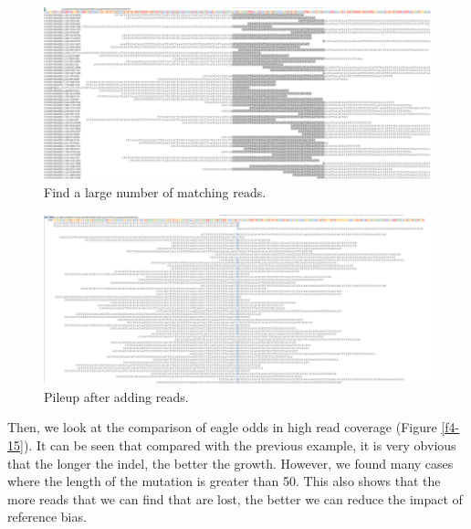 \vspace{1cm}
\begin{figure}[H]
    \centering
    \includegraphics[width=1\columnwidth]{body/image/4-13.png}
    \captionsetup{labelfont=bf}
    \renewcommand{\baselinestretch}{1.0}
    \vspace{-1cm}
    \caption[Find large amount reads in high coverage]{Find a large number of matching reads.}
    \label{f4-13}
\end{figure}
\vspace{0.5cm}
\begin{figure}[H]
    \centering
    \includegraphics[width=1\columnwidth]{body/image/4-14.png}
    \captionsetup{labelfont=bf}
    \renewcommand{\baselinestretch}{1.0}
    \vspace{-1cm}
    \caption[variant pileup in high coverage]{Pileup after adding reads.}
    \label{f4-14}
\end{figure}

Then, we look at the comparison of eagle odds in high read coverage (Figure \ref{f4-15}). It can be seen that compared with the previous example, it is very obvious that the longer the indel, the better the growth. However, we found many cases where the length of the mutation is greater than 50. This also shows that the more reads that we can find that are lost, the better we can reduce the impact of reference bias.

